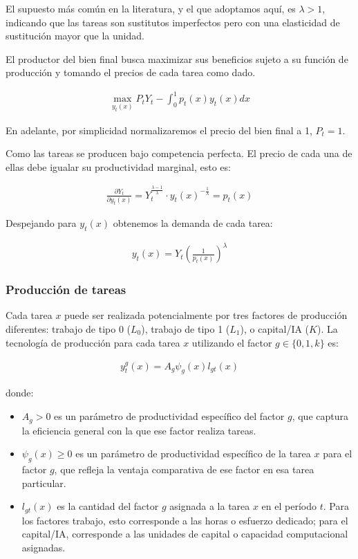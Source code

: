 \documentclass{article}
\theoremstyle{remark}
\theoremstyle{definition}
\begin{document}
El supuesto más común en la literatura, y el que adoptamos aquí, es $\lambda > 1$, indicando que las tareas son sustitutos imperfectos pero con una elasticidad de sustitución mayor que la unidad.

El productor del bien final busca maximizar sus beneficios sujeto a su funci\'on de producci\'on y tomando el precios de cada tarea como dado.

\begin{align*}
    \max_{y_t(x)} P_t Y_t - \int_0^1 p_t(x) y_t(x) dx
\end{align*}

En adelante, por simplicidad normalizaremos el precio del bien final a 1, $P_t=1$.

Como las tareas se producen bajo competencia perfecta. El precio de cada una de ellas debe igualar su productividad marginal, esto es:

\begin{align*}
    \frac{\partial Y_t}{\partial y_t(x)} = Y_t^{\frac{\lambda-1}{\lambda}} \cdot y_t(x)^{-\frac{1}{\lambda}} = p_t(x)
\end{align*}

Despejando para $y_t(x)$ obtenemos la demanda de cada tarea:

\begin{align*}
    \tag{Demanda Tarea x}
    y_t(x)  = Y_t \left( \frac{1}{p_t(x)} \right)^{\lambda}
    \label{eq:damanda_tarea}
\end{align*}

\subsubsection{Producci\'on de tareas}

Cada tarea $x$ puede ser realizada potencialmente por tres factores de producción diferentes: trabajo de tipo 0 ($L_0$), trabajo de tipo 1 ($L_1$), o capital/IA ($K$). La tecnología de producción para cada tarea $x$ utilizando el factor $g \in \{0, 1, k\}$ es:

\begin{align*}
    y_t^g(x) = A_g \psi_g(x) l_{gt}(x)
\end{align*}

donde:
\begin{itemize}
    \item $A_g > 0$ es un parámetro de productividad específico del factor $g$, que captura la eficiencia general con la que ese factor realiza tareas.
    \item $\psi_g(x) \geq 0$ es un parámetro de productividad específico de la tarea $x$ para el factor $g$, que refleja la ventaja comparativa de ese factor en esa tarea particular.
    \item $l_{gt}(x)$ es la cantidad del factor $g$ asignada a la tarea $x$ en el período $t$. Para los factores trabajo, esto corresponde a las horas o esfuerzo dedicado; para el capital/IA, corresponde a las unidades de capital o capacidad computacional asignadas.
\end{itemize}
\end{document}
